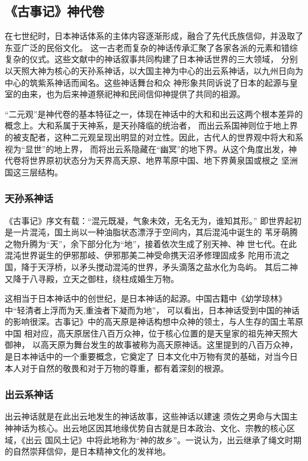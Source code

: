 \documentclass{ctexart}
\begin{document}
\subsection{《古事记》神代卷}

在七世纪时，日本神话体系的主体内容逐渐形成，融合了先代氏族信仰，并汲取了东亚广泛的民俗文化。
这一古老而复杂的神话传承汇聚了各家各派的元素和错综复杂的仪式。这些文献中的神话叙事共同构建了日本神话世界的三大领域，
分别以天照大神为核心的天孙系神话，以大国主神为中心的出云系神话，以九州日向为中心的筑紫系神话而闻名。这些神话舞台和众
神形象共同诉说了日本的起源与皇室的由来，也为后来神道祭祀神和民间信仰神提供了共同的祖源。

“二元观”是神代卷的基本特征之一，体现在神话中的大和和出云这两个根本差异的概念上。大和系属于天神系，是天孙降临的统治者，
而出云系国神则位于地上界的被支配者，这种二元观呈现出明显的对立性。因此，古代人的世界观中将大和系视为“显世”的地上界，
而将出云系隐藏在“幽冥”的地下界。从这个角度出发，神代卷将世界原初状态分为天界高天原、地界苇原中国、地下界黄泉国或根之
坚洲国这三层结构。

\subsubsection{天孙系神话}

《古事记》序文有载：“混元既凝，气象未效，无名无为，谁知其形。”
即世界起初是一片混沌，国土尚以一种油脂状态漂浮于空间内，其后混沌中诞生的
苇牙萌腾之物升腾为“天”，余下部分化为“地”，接着依次生成了别天神、神
世七代。在此混沌世界诞生的伊邪那岐、伊邪那美二神受命携天沼矛修理固成多
陀用币流之国，降于天浮桥，以矛头搅动混沌的世界，矛头滴落之盐水化为岛屿。
其后二神又降于八寻殿，立天之御柱，绕柱成婚生万物。\par

这相当于日本神话中的创世纪，是日本神话的起源。中国古籍中《幼学琼林》中“轻清者上浮而为天,重浊者下凝而为地”，
可以看出，日本神话受到中国的神话的影响很深。古事记》中的高天原是神话构想中众神的领土，与人生存的国土苇原中国
相对应，高天原居住八百万众神，位于核心位置的是天皇家的祖先神天照大御神，
以高天原为舞台发生的故事被称为高天原神话。这里提到的八百万众神，是日本神话中的一个重要概念，它奠定了
日本文化中万物有灵的基础，对当今日本人对于自然的敬畏和对于万物的尊重，都有着深刻的根源。

\subsubsection{出云系神话}

出云神话就是在此出云地发生的神话故事，这些神话以建速
须佐之男命与大国主神神话为核心。出云地区因其地缘优势自古就是日本政治、文化、宗教的核心区域，《出云
国风土记》中将此地称为“神的故乡”。一说认为，出云继承了绳文时期的自然崇拜信仰，是日本精神文化的发祥地。
\end{document}
